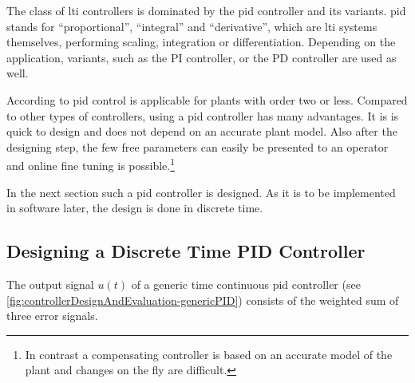 The class of \gls{lti} controllers is dominated by the \gls{pid} controller and its variants. \gls{pid} stands for ``proportional'', ``integral'' and ``derivative'', which are \gls{lti} systems themselves, performing scaling, integration or differentiation. Depending on the application, variants, such as the PI controller, or the PD controller are used as well.

According to \cite[p.~111]{Aastroem1995} \gls{pid} control is applicable for plants with order two or less.
Compared to other types of controllers, using a \gls{pid} controller has many advantages. It is is quick to design and does not depend on an accurate plant model. Also after the designing step, the few free parameters can easily be presented to an operator and online fine tuning is possible.\footnote{In contrast a compensating controller is based on an accurate model of the plant and changes on the fly are difficult.\cite{SergeZacher2010}}

In the next section such a \gls{pid} controller is designed. As it is to be implemented in software later, the design is done in discrete time.

\subsection{Designing a Discrete Time PID Controller}\label{sec:controlDesign}
The output signal $u(t)$ of a generic time continuous \gls{pid} controller (see \autoref{fig:controllerDesignAndEvaluation-genericPID}) consists of the weighted sum of three error signals.

